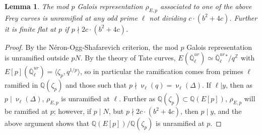 \documentclass[12pt]{amsart}
\newtheorem{lem}[thm]{Lemma}
\theoremstyle{definition}
\def\Q{{\mathbb Q}}
\def\Z{{\mathbb Z}}
\renewcommand{\bar}{\overline}
\newcommand{\notdiv}{\nmid}
\begin{document}
\begin{lem}\label{unram}
The mod $p$ Galois representation $\rho_{E,p}$ associated to one of the above Frey curves is unramified at any odd prime $\ell$ not dividing $c \cdot (b^2+4c)$.  Further it is finite flat at $p$ if $p \notdiv 2c\cdot (b^2+4c)$.
\end{lem}
\begin{proof}
By the N\'{e}ron-Ogg-Shafarevich criterion, the mod $p$ Galois representation is unramified outside $pN$.  By the theory of Tate curves, $E(\bar{\Q}_\ell^{ur}) \simeq \bar{\Q}_\ell^{ur}{}^\ast / q^{\Z}$ with $E[p](\bar{\Q}_\ell^{ur}) = \langle \zeta_p, q^{1/p} \rangle$, so in particular the ramification comes from primes $\ell$ ramified in $\Q(\zeta_p)$ and those such that $p \notdiv \upnu_\ell(q) = \upnu_\ell(\Delta)$.  If $\ell | y$, then as $p \mid \upnu_\ell(\Delta)$, $\rho_{E,p}$ is unramified at $\ell$.  Further as $\Q(\zeta_p) \subset \Q(E[p])$, $\rho_{E,p}$ will be ramified at $p$; however, if $p \mid N$, but $p \notdiv 2c \cdot (b^2+4c)$, then $p \mid y$, and the above argument shows that $\Q(E[p]) / \Q(\zeta_p)$ is unramified at $p$.
\end{proof}
\end{document}

